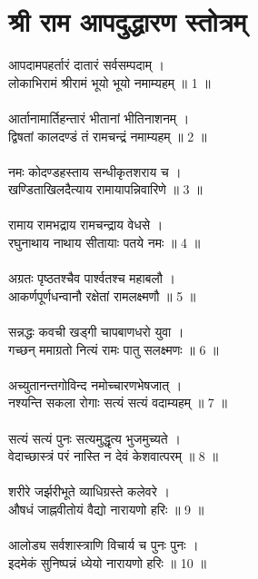 \section{श्री राम आपदुद्धारण स्तोत्रम्}
आपदामपहर्तारं दातारं सर्वसम्पदाम् ।\\
लोकाभिरामं श्रीरामं भूयो भूयो नमाम्यहम् ॥ 1 ॥\\
\\
आर्तानामार्तिहन्तारं भीतानां भीतिनाशनम् ।\\
द्विषतां कालदण्डं तं रामचन्द्रं नमाम्यहम् ॥ 2 ॥\\
\\
नमः कोदण्डहस्ताय सन्धीकृतशराय च ।\\
खण्डिताखिलदैत्याय रामायापन्निवारिणे ॥ 3 ॥\\
\\
रामाय रामभद्राय रामचन्द्राय वेधसे ।\\
रघुनाथाय नाथाय सीतायाः पतये नमः ॥ 4 ॥\\
\\
अग्रतः पृष्ठतश्चैव पार्श्वतश्च महाबलौ ।\\
आकर्णपूर्णधन्वानौ रक्षेतां रामलक्ष्मणौ ॥ 5 ॥\\
\\
सन्नद्धः कवची खड्गी चापबाणधरो युवा ।\\
गच्छन् ममाग्रतो नित्यं रामः पातु सलक्ष्मणः ॥ 6 ॥\\
\\
अच्युतानन्तगोविन्द नमोच्चारणभेषजात् ।\\
नश्यन्ति सकला रोगाः सत्यं सत्यं वदाम्यहम् ॥ 7 ॥\\
\\
सत्यं सत्यं पुनः सत्यमुद्धृत्य भुजमुच्यते ।\\
वेदाच्छास्त्रं परं नास्ति न देवं केशवात्परम् ॥ 8 ॥\\
\\
शरीरे जर्झरीभूते व्याधिग्रस्ते कलेवरे ।\\
औषधं जाह्नवीतोयं वैद्यो नारायणो हरिः ॥ 9 ॥\\
\\
आलोड्य सर्वशास्त्राणि विचार्य च पुनः पुनः ।\\
इदमेकं सुनिष्पन्नं ध्येयो नारायणो हरिः ॥ 10 ॥\\
